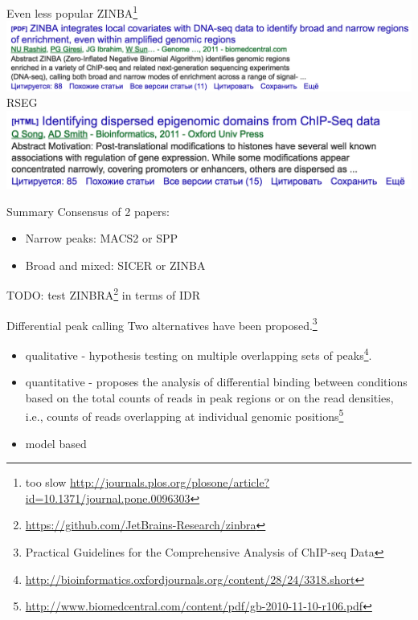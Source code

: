 \documentclass{beamer}
\begin{document}
\begin{frame}{Even less popular}
ZINBA\footnote{too slow \url{http://journals.plos.org/plosone/article?id=10.1371/journal.pone.0096303}}\\
\includegraphics[width=\linewidth]{ZINBA.png}\\
RSEG\\
\includegraphics[width=\linewidth]{RSEG.png}\\
\end{frame}

\begin{frame}{Summary}
Consensus of 2 papers:
\begin{itemize}
\item Narrow peaks: MACS2 or SPP
\item Broad and mixed: SICER or ZINBA
\end{itemize}
TODO: test ZINBRA\footnote{\url{https://github.com/JetBrains-Research/zinbra}} in terms of IDR
\end{frame}

\begin{frame}{Differential peak calling}
Two alternatives have been proposed.\footnote{Practical Guidelines for the Comprehensive Analysis of ChIP-seq Data}
\begin{itemize}
\item qualitative - hypothesis testing on multiple overlapping sets of peaks\footnote{\url{http://bioinformatics.oxfordjournals.org/content/28/24/3318.short}}.
\item quantitative -  proposes the analysis of differential binding between conditions based on the total counts of reads in peak regions or on the read densities, i.e., counts of reads overlapping at individual genomic positions\footnote{\url{http://www.biomedcentral.com/content/pdf/gb-2010-11-10-r106.pdf}}
\item model based
\end{itemize}
\end{frame}
\end{document}
